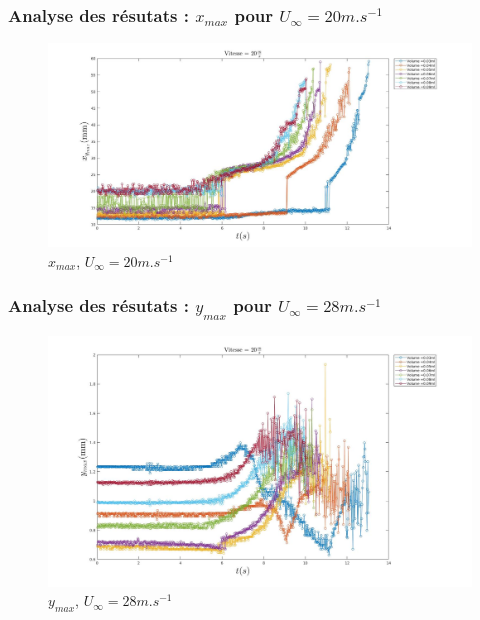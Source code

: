 \documentclass{beamer}
\begin{document}
\begin{frame}
\frametitle{Analyse des résutats : $x_{max}$ pour $U_{\infty}=20m.s^{-1}$}
\begin{figure}[!ht]
        \centering
	\includegraphics[width = \linewidth]{./image/v=20xm.jpg}
	\caption{$x_{max}$, $U_{\infty}=20m.s^{-1}$}
		\label{fig:v=20xm}
\end{figure}
\end{frame}

\begin{frame}
\frametitle{Analyse des résutats : $y_{max}$ pour $U_{\infty}=28m.s^{-1}$}
\begin{figure}[!ht]
        \centering
	\includegraphics[width = 0.9\linewidth]{./image/v=20ym.jpg}
	\caption{$y_{max}$, $U_{\infty}=28m.s^{-1}$}
		\label{fig:v=20ym}
\end{figure}
\end{frame}
\end{document}
